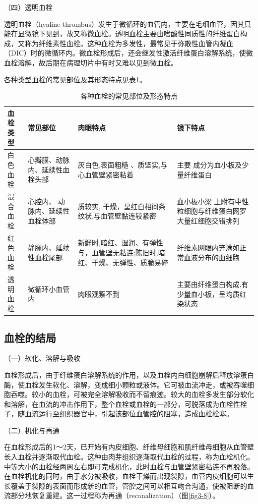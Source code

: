 {（四）透明血栓}

透明血栓（hyaline
thrombus）发生于微循环的血管内，主要在毛细血管，因其只能在显微镜下见到，故又称微血栓。透明血栓主要由嗜酸性同质性的纤维蛋白构成，又称为纤维素性血栓。这种血栓为多发性，最常见于弥散性血管内凝血（DIC）时的微循环内。微血栓形成后，还会继发性激活纤维蛋白溶解系统，使微血栓溶解，故后期在病理切片中有时又难以见到微血栓。

各种类型血栓的常见部位及其形态特点见表\ref{tab3-1}。

      \begin{table}[ht]
        \caption{各种血栓的常见部位及形态特点}
        \label{tab3-1}
        \centering
        \begin{tabular}{lp{5cm}p{5cm}p{5cm}}
        \toprule
        血栓类型 & 常见部位 & 肉眼特点 & 镜下特点 \\
        \midrule
        白色血栓 & 心瓣膜、动脉内、延续性血栓头部 &
        灰白色,表面粗糙 、质坚实,与心血管壁紧密粘着 & 主要 成分为血小板及少量纤维蛋白\\
        混合血栓 &心腔内、 动脉内、延续性血栓体部
        & 质较实, 干燥，呈红白相间条纹状,与血管壁黏连较紧密 &  血小板小梁 上附有中性粒细胞与纤维蛋白网罗大量红细胞交错排列 \\
        红色血栓 & 静脉内、延续性血栓尾部
        & 新鲜时,暗红、湿润、有弹性与，血管壁无粘连;陈旧时,暗红、干燥、无弹性、质脆易碎 
        & 纤维素网眼内充满如正常血液分布的血细胞 \\
        透明血栓 & 微循环小血管内 & 肉眼观察不到&
        主要由纤维蛋白构成,有少量血小板，呈均质红染状态\\
        \bottomrule
        \end{tabular}
      \end{table}

\subsection{血栓的结局}

{（一）软化、溶解与吸收}

血栓形成后，由于纤维蛋白溶解系统的作用，以及血栓内白细胞崩解后释放溶蛋白酶，使血栓发生软化、溶解，变成细小颗粒或液体。它可被血流冲走，或被吞噬细胞吞噬。较小的血栓，可被完全溶解吸收而不留痕迹。较大的血栓多发生部分软化和溶解，在血流的冲击作用下，整个血栓或血栓的一部分，可脱落成为血栓性栓子，随血流运行至组织器官中，引起该部位血管腔的阻塞，造成血栓栓塞。

{（二）机化与再通}

在血栓形成后的1～2天，已开始有内皮细胞、纤维母细胞和肌纤维母细胞从血管壁长入血栓并逐渐取代血栓。这种由肉芽组织逐渐取代血栓的过程，称为血栓机化。中等大小的血栓经两周左右即可完成机化，此时血栓与血管壁紧密粘连不再脱落。在血栓机化的同时，由于水分被吸收，血栓干燥而出现裂隙，血管内皮细胞可以生长覆盖于裂隙的表面而形成新的血管，管腔之间可以相互吻合沟通，使被阻断的血流部分地恢复重建。这一过程称为再通（recanalization）（图\ref{fig3-8}）。

